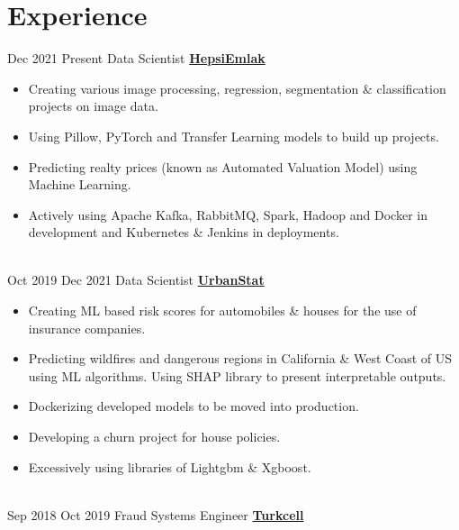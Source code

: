 \documentclass[letterpaper]{DS_class_file} %
\begin{document}

\section{Experience}

\begin{twenty}
    \twentyitem
		{Dec 2021}
		{Present}
		{\hspace{0.3cm}Data Scientist}
		{\href{https://www.hepsiemlak.com/}{\textbf{HepsiEmlak}}}
		{}
		{\begin{itemize}
			\item Creating various image processing, regression, segmentation \& classification projects on image data.
			\item Using Pillow, PyTorch and Transfer Learning models to build up projects.
			\item Predicting realty prices (known as Automated Valuation Model) using Machine Learning.
			\item Actively using Apache Kafka, RabbitMQ, Spark, Hadoop and Docker in development and Kubernetes \& Jenkins in deployments.
		\end{itemize}}
		\\
	\twentyitem
		{Oct 2019}
		{Dec 2021}
		{\hspace{0.3cm}Data Scientist}
		{\href{https://www.urbanstat.com/}{\textbf{UrbanStat}}}
		{}
		{\begin{itemize}
			\item Creating ML based risk scores for automobiles \& houses for the use of insurance companies.
			\item Predicting wildfires and dangerous regions in California \& West Coast of US using ML algorithms. Using SHAP library to present interpretable outputs.
			\item Dockerizing developed models to be moved into production.
			\item Developing a churn project for house policies.
			\item Excessively using libraries of Lightgbm \& Xgboost.
		\end{itemize}}
		\\
	\twentyitem
		{Sep 2018}
		{Oct 2019}
		{\hspace{0.3cm}Fraud Systems Engineer}
		{\href{https://www.turkcell.com.tr/}{\textbf{Turkcell}}}
		{}
		{\begin{itemize}

\end{itemize}}
\end{twenty}
\end{document}
